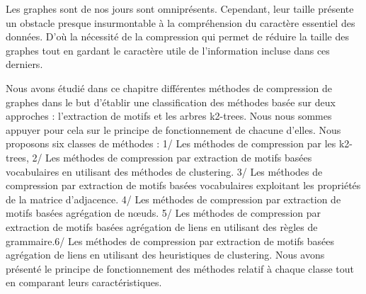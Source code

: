 Les graphes sont de nos jours sont omniprésents. Cependant, leur taille présente un obstacle presque insurmontable à la compréhension du caractère essentiel des données. D'où la nécessité de la compression qui permet de réduire la taille des graphes tout en gardant le caractère utile de l'information incluse dans ces derniers.

Nous avons étudié dans ce chapitre différentes méthodes de compression de graphes dans le but d'établir une classification des méthodes basée sur deux approches : l'extraction de motifs et les arbres k2-trees. Nous nous sommes appuyer pour cela sur le principe de fonctionnement de chacune d'elles. Nous  proposons six classes de méthodes : 1/ Les méthodes de compression par les k2-trees, 2/ Les méthodes de compression par extraction de motifs basées vocabulaires en utilisant des méthodes de clustering. 3/ Les méthodes de compression par extraction de motifs basées vocabulaires exploitant les propriétés de la matrice d'adjacence. 4/ Les méthodes de compression par extraction de motifs basées agrégation de nœuds. 5/ Les méthodes de compression par extraction de motifs basées agrégation de liens en utilisant des règles de grammaire.6/ Les méthodes de compression par extraction de motifs basées agrégation de liens en utilisant des heuristiques de clustering.	
Nous avons présenté le principe de fonctionnement des méthodes relatif à chaque classe tout en comparant leurs caractéristiques. 

